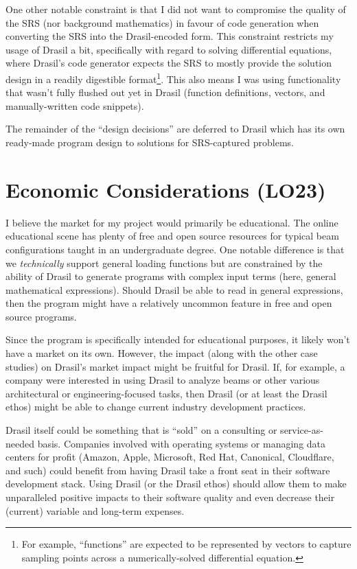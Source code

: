 \documentclass{article}
\begin{document}
One other notable constraint is that I did not want to compromise the quality of
the SRS (nor background mathematics) in favour of code generation when
converting the SRS into the Drasil-encoded form. This constraint restricts my
usage of Drasil a bit, specifically with regard to solving differential
equations, where Drasil's code generator expects the SRS to mostly provide the
solution design in a readily digestible format\footnote{For example,
``functions'' are expected to be represented by vectors to capture sampling
points across a numerically-solved differential equation.}. This also means I
was using functionality that wasn't fully flushed out yet in Drasil (function
definitions, vectors, and manually-written code snippets).

The remainder of the ``design decisions'' are deferred to Drasil which has its
own ready-made program design to solutions for SRS-captured problems.

\section{Economic Considerations (LO23)}

I believe the market for my project would primarily be educational. The online
educational scene has plenty of free and open source resources for typical beam
configurations taught in an undergraduate degree. One notable difference is that
we \textit{technically} support general loading functions but are constrained by
the ability of Drasil to generate programs with complex input terms (here,
general mathematical expressions). Should Drasil be able to read in general
expressions, then the program might have a relatively uncommon feature in free
and open source programs. 

Since the program is specifically intended for educational purposes, it likely
won't have a market on its own. However, the impact (along with the other case
studies) on Drasil's market impact might be fruitful for Drasil. If, for
example, a company were interested in using Drasil to analyze beams or other
various architectural or engineering-focused tasks, then Drasil (or at least the
Drasil ethos) might be able to change current industry development practices.

Drasil itself could be something that is ``sold'' on a consulting or
service-as-needed basis. Companies involved with operating systems or managing
data centers for profit (Amazon, Apple, Microsoft, Red Hat, Canonical,
Cloudflare, and such) could benefit from having Drasil take a front seat in
their software development stack. Using Drasil (or the Drasil ethos) should
allow them to make unparalleled positive impacts to their software quality and
even decrease their (current) variable and long-term expenses.
\end{document}
